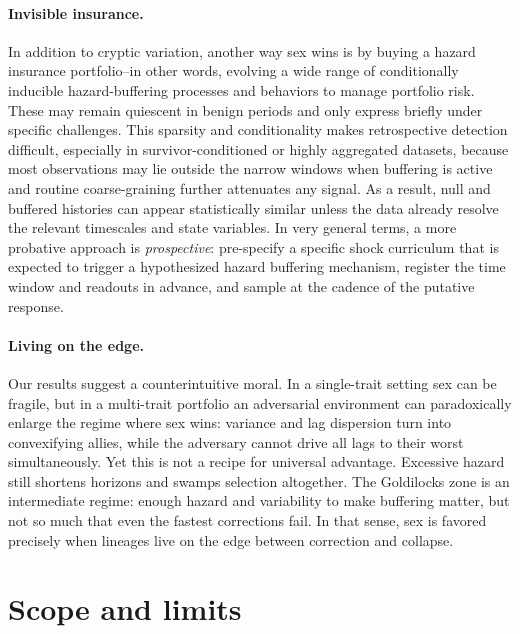 \documentclass[11pt]{article}
\theoremstyle{upright}
\begin{document}
\paragraph{Invisible insurance.}
In addition to cryptic variation, another way sex wins is by buying a hazard insurance 
portfolio--in other words, evolving a wide range of conditionally inducible hazard-buffering processes and behaviors to manage portfolio risk. These may 
remain quiescent in benign periods and only express briefly under specific challenges. This sparsity and conditionality makes 
retrospective detection difficult, especially in survivor-conditioned  or highly aggregated datasets, because most observations may lie 
outside the narrow windows when buffering is active and routine coarse-graining further attenuates any signal. As a 
result, null and buffered histories can appear statistically similar unless the data already resolve the relevant timescales 
and state variables. In very general terms, a more probative approach is \emph{prospective}: pre-specify a specific shock 
curriculum that is expected to trigger a hypothesized hazard buffering mechanism, register the time window and readouts 
in advance, and sample at the cadence of the  putative response.

\paragraph{Living on the edge.}
Our results suggest a counterintuitive moral. In a single-trait setting sex can
be fragile, but in a multi-trait portfolio an adversarial environment can
paradoxically enlarge the regime where sex wins: variance and lag dispersion
turn into convexifying allies, while the adversary cannot drive all lags to
their worst simultaneously. Yet this is not a recipe for universal advantage.
Excessive hazard still shortens horizons and swamps selection altogether. The
Goldilocks zone is an intermediate regime: enough hazard and variability to make
buffering matter, but not so much that even the fastest corrections fail. In
that sense, sex is favored precisely when lineages live on the edge between
correction and collapse.


\section{Scope and limits}
\label{sec:scope}
\end{document}
